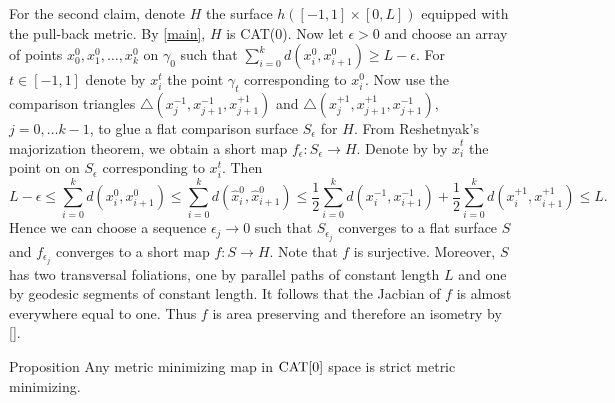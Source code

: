 \documentclass[a4paper,10pt]{amsart}
\begin{document}
For the second claim, denote $H$ the surface $h([-1,1]\times[0,L])$ equipped with the pull-back metric. By \ref{main}, $H$
is CAT(0).
Now let $\epsilon>0$ and choose an array of points $x_0^{0},x_1^{0},\ldots,x_k^{0}$ on $\gamma_{0}$ 
such that $\sum_{i=0}^k d(x_i^{0},x_{i+1}^{0})\geq L-\epsilon$. For $t\in[-1,1]$ denote by $x_i^{t}$ the
point $\gamma_t$ corresponding to $x_i^{0}$. Now use the comparison triangles
$\triangle(x_{j}^{-1},x_{j+1}^{-1},x_{j+1}^{+1})$ and $\triangle(x_{j}^{+1},x_{j+1}^{+1},x_{j+1}^{-1})$, $j=0,\ldots k-1$,
to glue a flat comparison surface $S_\epsilon$ for $H$. From Reshetnyak's majorization theorem, we obtain a short map 
$f_\epsilon:S_\epsilon\to H$. Denote by by $\hat x_i^{t}$ the point on on $S_\epsilon$ corresponding to $x_i^{t}$. Then
$$
L-\epsilon\leq\sum_{i=0}^k d(x_i^{0},x_{i+1}^{0})\leq\sum_{i=0}^k d(\hat x_i^{0},\hat x_{i+1}^{0})\leq
\frac{1}{2}\sum_{i=0}^k d(x_i^{-1}, x_{i+1}^{-1})+\frac{1}{2}\sum_{i=0}^k d(x_i^{+1}, x_{i+1}^{+1})\leq L.
$$
Hence we can choose a sequence $\epsilon_j\to 0$ such that $S_{\epsilon_j}$ converges to a flat surface $S$ and $f_{\epsilon_j}$
converges to a short map $f:S\to H$. Note that $f$ is surjective. Moreover, $S$
has two transversal foliations, one by parallel paths of constant length $L$ and one by geodesic segments of constant length.
It follows that the Jacbian of $f$ is almost everywhere equal to one. Thus $f$ is area preserving and therefore an isometry by \ref{}.
\qeds


\begin{thm}{Proposition}\label{prop:strict-mm}
Any metric minimizing map in $\mathop{\rm CAT}\nolimits[0]$ space is strict metric minimizing.
\end{thm}
\end{document}
